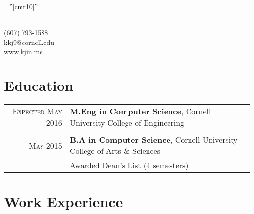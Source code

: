 \documentclass[a4paper,10pt]{article} %
\begin{document}
\pagestyle{empty} %

\font\fb=''[cmr10]'' %


\par{\\
(607) 793-1588\\
kkj9@cornell.edu\\
www.kjin.me\bigskip\par}


\section{Education}

\begin{tabular}{r|p{11cm}}
\textsc{Expected May 2016} & \textbf{M.Eng in Computer Science}, Cornell University College of Engineering\\

\multicolumn{2}{c}{} \\


\textsc{May 2015} & \textbf{B.A in Computer Science}, Cornell University College of Arts \& Sciences\\
& \footnotesize{Awarded Dean's List (4 semesters)}

\end{tabular}


\section{Work Experience}
\end{document}
